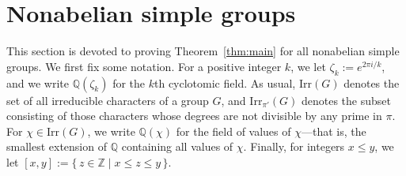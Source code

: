 \documentclass[12pt]{amsart}
\theoremstyle{definition}
\numberwithin{equation}{section}
\newcommand{\Irr}{{\mathrm {Irr}}}
\newcommand{\QQ}{{\mathbb Q}}
\newcommand{\ZZ}{{\mathbb Z}}
\newcommand{\Al}{\textup{\textsf{A}}}
\newcommand{\Sy}{\textup{\textsf{S}}}
\begin{document}
%


\section{Nonabelian simple groups}

This %
section is devoted to proving Theorem~\ref{thm:main} for %
all
nonabelian simple %
groups. We first fix some notation. For a
positive integer $k$, we %
let $\zeta_k:=e^{2\pi i/k}$, and %
we write $\QQ(\zeta_k)$ for the $k$th
cyclotomic field. As usual, $\Irr(G)$ denotes
the set of all irreducible characters of a group $G$, and
$\Irr_{\pi'}(G)$ denotes the subset consisting of those characters
whose degrees are not divisible by any prime in $\pi$. For
$\chi\in\Irr(G)$, we write $\QQ(\chi)$ for the field of values of
$\chi$---that is, %
the smallest extension of $\QQ$ containing all
values of $\chi$. Finally, for integers $x\le y$, we let
$[x,y]:=\{\,z\in\ZZ \mid x\le z\le y\,\}$.
\end{document}
